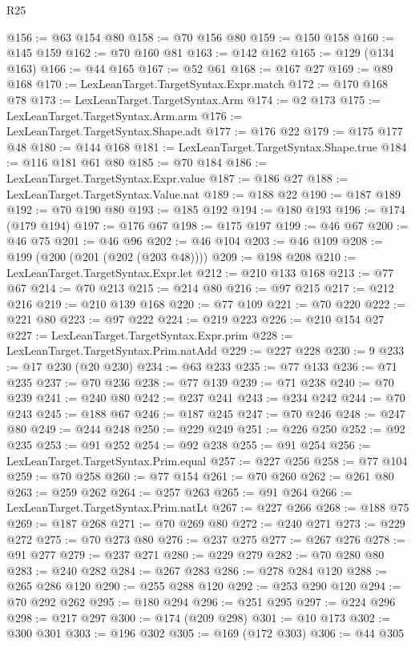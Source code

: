 \begin{lexlean}{R25}
\begin{coremodule}
@156 := @63 @154 @80
@158 := @70 @156 @80
@159 := @150 @158
@160 := @145 @159
@162 := @70 @160 @81
@163 := @142 @162
@165 := @129 (@134 @163)
@166 := @44 @165
@167 := @52 @61
@168 := @167 @27
@169 := @89 @168
@170 := LexLeanTarget.TargetSyntax.Expr.match
@172 := @170 @168 @78
@173 := LexLeanTarget.TargetSyntax.Arm
@174 := @2 @173
@175 := LexLeanTarget.TargetSyntax.Arm.arm
@176 := LexLeanTarget.TargetSyntax.Shape.adt
@177 := @176 @22
@179 := @175 @177 @48
@180 := @144 @168
@181 := LexLeanTarget.TargetSyntax.Shape.true
@184 := @116 @181 @61 @80
@185 := @70 @184
@186 := LexLeanTarget.TargetSyntax.Expr.value
@187 := @186 @27
@188 := LexLeanTarget.TargetSyntax.Value.nat
@189 := @188 @22
@190 := @187 @189
@192 := @70 @190 @80
@193 := @185 @192
@194 := @180 @193
@196 := @174 (@179 @194)
@197 := @176 @67
@198 := @175 @197
@199 := @46 @67
@200 := @46 @75
@201 := @46 @96
@202 := @46 @104
@203 := @46 @109
@208 := @199 (@200 (@201 (@202 (@203 @48))))
@209 := @198 @208
@210 := LexLeanTarget.TargetSyntax.Expr.let
@212 := @210 @133 @168
@213 := @77 @67
@214 := @70 @213
@215 := @214 @80
@216 := @97 @215
@217 := @212 @216
@219 := @210 @139 @168
@220 := @77 @109
@221 := @70 @220
@222 := @221 @80
@223 := @97 @222
@224 := @219 @223
@226 := @210 @154 @27
@227 := LexLeanTarget.TargetSyntax.Expr.prim
@228 := LexLeanTarget.TargetSyntax.Prim.natAdd
@229 := @227 @228
@230 := 9
@233 := @17 @230 (@20 @230)
@234 := @63 @233
@235 := @77 @133
@236 := @71 @235
@237 := @70 @236
@238 := @77 @139
@239 := @71 @238
@240 := @70 @239
@241 := @240 @80
@242 := @237 @241
@243 := @234 @242
@244 := @70 @243
@245 := @188 @67
@246 := @187 @245
@247 := @70 @246
@248 := @247 @80
@249 := @244 @248
@250 := @229 @249
@251 := @226 @250
@252 := @92 @235
@253 := @91 @252
@254 := @92 @238
@255 := @91 @254
@256 := LexLeanTarget.TargetSyntax.Prim.equal
@257 := @227 @256
@258 := @77 @104
@259 := @70 @258
@260 := @77 @154
@261 := @70 @260
@262 := @261 @80
@263 := @259 @262
@264 := @257 @263
@265 := @91 @264
@266 := LexLeanTarget.TargetSyntax.Prim.natLt
@267 := @227 @266
@268 := @188 @75
@269 := @187 @268
@271 := @70 @269 @80
@272 := @240 @271
@273 := @229 @272
@275 := @70 @273 @80
@276 := @237 @275
@277 := @267 @276
@278 := @91 @277
@279 := @237 @271
@280 := @229 @279
@282 := @70 @280 @80
@283 := @240 @282
@284 := @267 @283
@286 := @278 @284 @120
@288 := @265 @286 @120
@290 := @255 @288 @120
@292 := @253 @290 @120
@294 := @70 @292 @262
@295 := @180 @294
@296 := @251 @295
@297 := @224 @296
@298 := @217 @297
@300 := @174 (@209 @298)
@301 := @10 @173
@302 := @300 @301
@303 := @196 @302
@305 := @169 (@172 @303)
@306 := @44 @305

\end{coremodule}
\end{lexlean}
